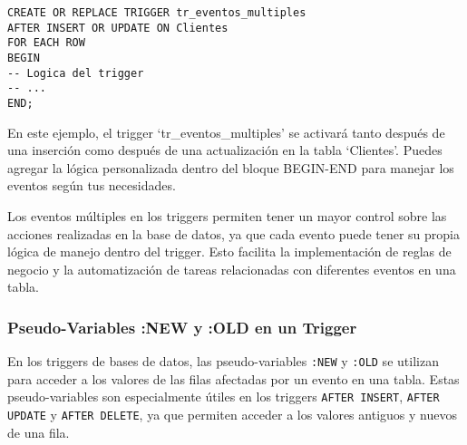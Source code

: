\documentclass[executivepaper]{article}
\begin{document}
\begin{lstlisting}
CREATE OR REPLACE TRIGGER tr_eventos_multiples
AFTER INSERT OR UPDATE ON Clientes
FOR EACH ROW
BEGIN
-- Logica del trigger
-- ...
END;
\end{lstlisting}

En este ejemplo, el trigger \enquote*{tr\_eventos\_multiples} se activará tanto después de una inserción como después de una actualización en la tabla \enquote*{Clientes}. Puedes agregar la lógica personalizada dentro del bloque BEGIN-END para manejar los eventos según tus necesidades.

Los eventos múltiples en los triggers permiten tener un mayor control sobre las acciones realizadas en la base de datos, ya que cada evento puede tener su propia lógica de manejo dentro del trigger. Esto facilita la implementación de reglas de negocio y la automatización de tareas relacionadas con diferentes eventos en una tabla.

\subsubsection*{Pseudo-Variables :NEW y :OLD en un Trigger}

En los triggers de bases de datos, las pseudo-variables \texttt{:NEW} y \texttt{:OLD} se utilizan para acceder a los valores de las filas afectadas por un evento en una tabla. Estas pseudo-variables son especialmente útiles en los triggers \texttt{AFTER INSERT}, \texttt{AFTER UPDATE} y \texttt{AFTER DELETE}, ya que permiten acceder a los valores antiguos y nuevos de una fila.
\end{document}
